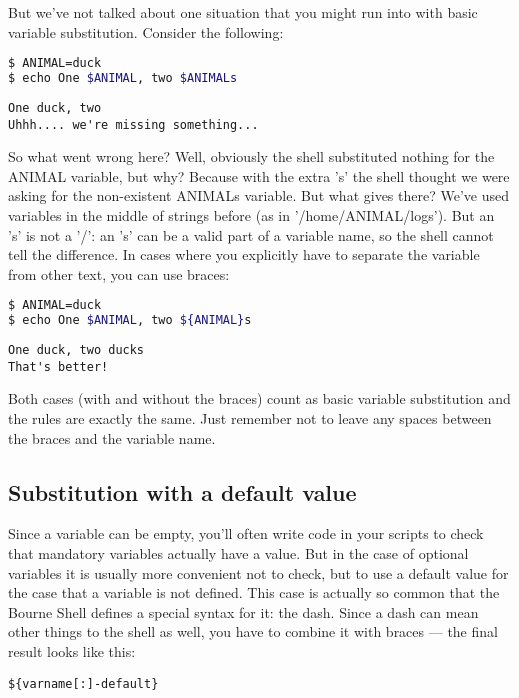 But we've not talked about one situation that you might run into with basic
variable substitution. Consider the following:
\lstset{basicstyle=\scriptsize, numbers=left, captionpos=b, tabsize=4}
\begin{lstlisting}[caption=Adding some text to a variable's value,language={bash},
breaklines=true,xleftmargin=15pt,label=lst:Adding some text to a variable's value]
$ ANIMAL=duck
$ echo One $ANIMAL, two $ANIMALs
\end{lstlisting}
\scriptsize
\begin{verbatim}
One duck, two
Uhhh.... we're missing something...
\end{verbatim}
\normalsize
So what went wrong here? Well, obviously the shell substituted nothing for the
ANIMAL variable, but why? Because with the extra 's' the shell thought we were
asking for the non-existent ANIMALs variable. But what gives there? We've used
variables in the middle of strings before (as in '/home/ANIMAL/logs'). But an
's' is not a '/': an 's' can be a valid part of a variable name, so the shell
cannot tell the difference. In cases where you explicitly have to separate the
variable from other text, you can use braces:
\lstset{basicstyle=\scriptsize, numbers=left, captionpos=b, tabsize=4}
\begin{lstlisting}[caption=Adding some text to a variable's value take II,language={bash},
breaklines=true,xleftmargin=15pt,label=lst:AddingsometexttoavariablesvaluetakeII]
$ ANIMAL=duck
$ echo One $ANIMAL, two ${ANIMAL}s
\end{lstlisting}
\scriptsize
\begin{verbatim}
One duck, two ducks
That's better!
\end{verbatim}
\normalsize
Both cases (with and without the braces) count as basic variable substitution
and the rules are exactly the same. Just remember not to leave any spaces
between the braces and the variable name.

\subsection{Substitution with a default value}
Since a variable can be empty, you'll often write code in your scripts to check
that mandatory variables actually have a value. But in the case of optional
variables it is usually more convenient not to check, but to use a default
value for the case that a variable is not defined. This case is actually so
common that the Bourne Shell defines a special syntax for it: the dash. Since a
dash can mean other things to the shell as well, you have to combine it with
braces --- the final result looks like this:
\scriptsize
\begin{verbatim}
${varname[:]-default}
\end{verbatim}
\normalsize

